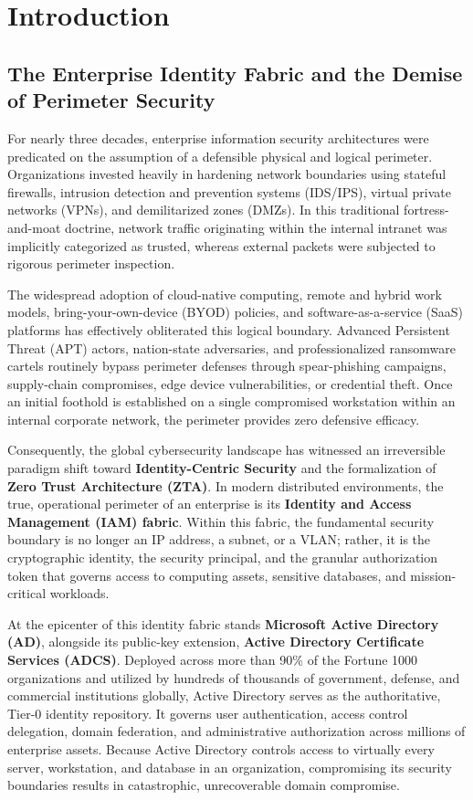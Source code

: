 \chapter{Introduction}
\label{ch:introduction}

\section[Enterprise Identity Fabric and Demise of Perimeter Security]{The Enterprise Identity Fabric and the Demise of Perimeter Security}
For nearly three decades, enterprise information security architectures were predicated on the assumption of a defensible physical and logical perimeter. Organizations invested heavily in hardening network boundaries using stateful firewalls, intrusion detection and prevention systems (IDS/IPS), virtual private networks (VPNs), and demilitarized zones (DMZs). In this traditional fortress-and-moat doctrine, network traffic originating within the internal intranet was implicitly categorized as trusted, whereas external packets were subjected to rigorous perimeter inspection.

The widespread adoption of cloud-native computing, remote and hybrid work models, bring-your-own-device (BYOD) policies, and software-as-a-service (SaaS) platforms has effectively obliterated this logical boundary. Advanced Persistent Threat (APT) actors, nation-state adversaries, and professionalized ransomware cartels routinely bypass perimeter defenses through spear-phishing campaigns, supply-chain compromises, edge device vulnerabilities, or credential theft. Once an initial foothold is established on a single compromised workstation within an internal corporate network, the perimeter provides zero defensive efficacy.

Consequently, the global cybersecurity landscape has witnessed an irreversible paradigm shift toward \textbf{Identity-Centric Security} and the formalization of \textbf{Zero Trust Architecture (ZTA)}. In modern distributed environments, the true, operational perimeter of an enterprise is its \textbf{Identity and Access Management (IAM) fabric}. Within this fabric, the fundamental security boundary is no longer an IP address, a subnet, or a VLAN; rather, it is the cryptographic identity, the security principal, and the granular authorization token that governs access to computing assets, sensitive databases, and mission-critical workloads.

At the epicenter of this identity fabric stands \textbf{Microsoft Active Directory (AD)}, alongside its public-key extension, \textbf{Active Directory Certificate Services (ADCS)}. Deployed across more than 90\% of the Fortune 1000 organizations and utilized by hundreds of thousands of government, defense, and commercial institutions globally, Active Directory serves as the authoritative, Tier-0 identity repository. It governs user authentication, access control delegation, domain federation, and administrative authorization across millions of enterprise assets. Because Active Directory controls access to virtually every server, workstation, and database in an organization, compromising its security boundaries results in catastrophic, unrecoverable domain compromise.

